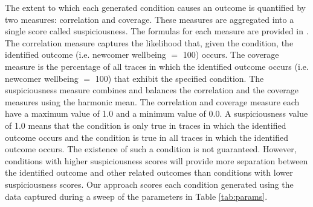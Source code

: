 \documentclass{scspaperproc}
\theoremstyle{scsthe}
\begin{document}
The extent to which each generated condition causes an outcome is quantified by two measures: correlation and coverage. These measures are aggregated into a single score called suspiciousness. The formulas for each measure are provided in \cite{diallo2016formal}. The correlation measure captures the likelihood that, given the condition, the identified outcome (i.e. newcomer wellbeing $=$ 100) occurs. The coverage measure is the percentage of all traces in which the identified outcome occurs (i.e. newcomer wellbeing $=$ 100) that exhibit the specified condition. The suspiciousness measure combines and balances the correlation and the coverage measures using the harmonic mean. The correlation and coverage measure each have a maximum value of 1.0 and a minimum value of 0.0. A suspiciousness value of 1.0 means that the condition is only true in traces in which the identified outcome occurs and the condition is true in all traces in which the identified outcome occurs. The existence of such a condition is not guaranteed. However, conditions with higher suspiciousness scores will provide more separation between the identified outcome and other related outcomes than conditions with lower suspiciousness scores. Our approach scores each condition generated using the data captured during a sweep of the parameters in Table \ref{tab:params}.
\end{document}
